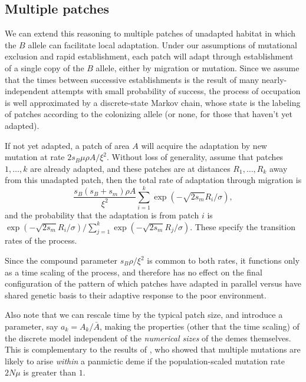 \documentclass{article}
\begin{document}
\subsection{Multiple patches}


We can extend this reasoning to multiple patches of unadapted habitat 
in which the $B$ allele can facilitate local adaptation. 
Under our assumptions of mutational exclusion and rapid establishment, 
each patch will adapt through establishment of a single copy of the $B$ allele, 
either by migration or mutation.
Since we assume that the times between successive establishments is the result of many nearly-independent attempts
with small probability of success,
the process of occupation is well approximated by a discrete-state Markov chain,
whose state is the labeling of patches according to the colonizing allele
(or none, for those that haven't yet adapted).

If not yet adapted,
a patch of area $A$ will acquire the adaptation by new mutation at rate $2 s_B \mu \rho A/\xi^2$.
Without loss of generality, assume that patches $1, \ldots, k$ are already adapted,
and these patches are at distances $R_1, \ldots, R_k$ away from this unadapted patch, 
then the total rate of adaptation through migration is
\begin{equation}
  \frac{ s_B (s_B+s_m) \rho A}{\xi^2} \sum_{i=1}^{k} \exp\left(- \sqrt{2 s_m} R_i/\sigma\right),
\end{equation}
and the probability that the adaptation is from patch $i$ is $\exp\left(- \sqrt{2 s_m} R_i/\sigma\right)/\sum_{j=1}^{k} \exp\left(- \sqrt{2 s_m} R_j/\sigma\right)$.
These specify the transition rates of the process.

Since the compound parameter $s_B \rho / \xi^2$ is common to both rates,
it functions only as a time scaling of the process, 
and therefore has no effect on the final configuration of the pattern of which patches have adapted
in parallel versus have shared genetic basis to their adaptive response to the poor environment.

Also note that we can rescale time by the typical patch size, and introduce a parameter, say $a_k = A_k/\bar A$,
making the properties (other that the time scaling) of the discrete model independent of the \emph{numerical sizes} of the demes themselves.
This is complementary to the results of \cite{softsweepsII}, who showed that multiple mutations are likely to arise \emph{within} a panmictic deme
if the population-scaled mutation rate $2 N \mu$ is greater than $1$.
\end{document}
